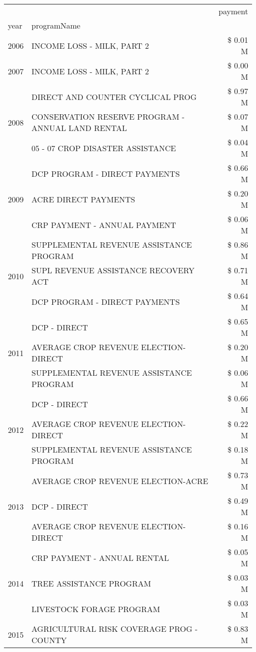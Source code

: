 \begin{tabular}{llr}
\toprule
 &  & payment \\
year & programName &  \\
\midrule
2006 & INCOME LOSS - MILK, PART 2 & \$ 0.01 M \\
\cline{1-3}
2007 & INCOME LOSS - MILK, PART 2 & \$ 0.00 M \\
\cline{1-3}
\multirow[t]{3}{*}{2008} & DIRECT AND COUNTER CYCLICAL PROG & \$ 0.97 M \\
 & CONSERVATION RESERVE PROGRAM - ANNUAL LAND RENTAL & \$ 0.07 M \\
 & 05 - 07 CROP DISASTER ASSISTANCE & \$ 0.04 M \\
\cline{1-3}
\multirow[t]{3}{*}{2009} & DCP PROGRAM - DIRECT PAYMENTS & \$ 0.66 M \\
 & ACRE DIRECT PAYMENTS & \$ 0.20 M \\
 & CRP PAYMENT - ANNUAL PAYMENT & \$ 0.06 M \\
\cline{1-3}
\multirow[t]{3}{*}{2010} & SUPPLEMENTAL REVENUE ASSISTANCE PROGRAM & \$ 0.86 M \\
 & SUPL REVENUE ASSISTANCE RECOVERY ACT & \$ 0.71 M \\
 & DCP PROGRAM - DIRECT PAYMENTS & \$ 0.64 M \\
\cline{1-3}
\multirow[t]{3}{*}{2011} & DCP - DIRECT & \$ 0.65 M \\
 & AVERAGE CROP REVENUE ELECTION-DIRECT & \$ 0.20 M \\
 & SUPPLEMENTAL REVENUE ASSISTANCE PROGRAM & \$ 0.06 M \\
\cline{1-3}
\multirow[t]{3}{*}{2012} & DCP - DIRECT & \$ 0.66 M \\
 & AVERAGE CROP REVENUE ELECTION-DIRECT & \$ 0.22 M \\
 & SUPPLEMENTAL REVENUE ASSISTANCE PROGRAM & \$ 0.18 M \\
\cline{1-3}
\multirow[t]{3}{*}{2013} & AVERAGE CROP REVENUE ELECTION-ACRE & \$ 0.73 M \\
 & DCP - DIRECT & \$ 0.49 M \\
 & AVERAGE CROP REVENUE ELECTION-DIRECT & \$ 0.16 M \\
\cline{1-3}
\multirow[t]{3}{*}{2014} & CRP PAYMENT - ANNUAL RENTAL & \$ 0.05 M \\
 & TREE ASSISTANCE PROGRAM & \$ 0.03 M \\
 & LIVESTOCK FORAGE PROGRAM & \$ 0.03 M \\
\cline{1-3}
\multirow[t]{3}{*}{2015} & AGRICULTURAL RISK COVERAGE PROG - COUNTY & \$ 0.83 M \\

\end{tabular}
